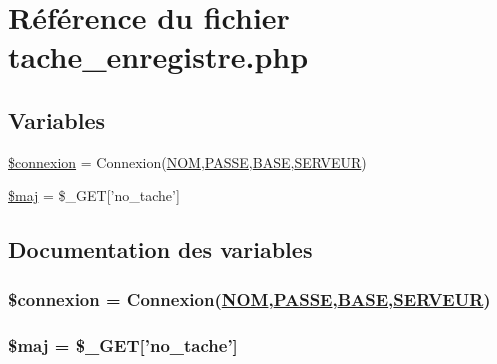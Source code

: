 \hypertarget{tache__enregistre_8php}{
\section{R\'{e}f\'{e}rence du fichier tache\_\-enregistre.php}
\label{tache__enregistre_8php}
}
\subsection*{Variables}
\begin{CompactItemize}
\item 
\hyperlink{tache__enregistre_8php_a0}{\$connexion} = Connexion(\hyperlink{pma__connect_8php_a0}{NOM},\hyperlink{pma__connect_8php_a1}{PASSE},\hyperlink{pma__connect_8php_a3}{BASE},\hyperlink{pma__connect_8php_a2}{SERVEUR})
\item 
\hyperlink{tache__enregistre_8php_a1}{\$maj} = \$\_\-GET\mbox{[}'no\_\-tache'\mbox{]}
\end{CompactItemize}


\subsection{Documentation des variables}
\hypertarget{tache__enregistre_8php_a0}{
\subsubsection[\$connexion]{\setlength{\rightskip}{0pt plus 5cm}\$connexion = Connexion(\hyperlink{pma__connect_8php_a0}{NOM},\hyperlink{pma__connect_8php_a1}{PASSE},\hyperlink{pma__connect_8php_a3}{BASE},\hyperlink{pma__connect_8php_a2}{SERVEUR})}}
\label{tache__enregistre_8php_a0}


\hypertarget{tache__enregistre_8php_a1}{
\subsubsection[\$maj]{\setlength{\rightskip}{0pt plus 5cm}\$maj = \$\_\-GET\mbox{[}'no\_\-tache'\mbox{]}}}
\label{tache__enregistre_8php_a1}


